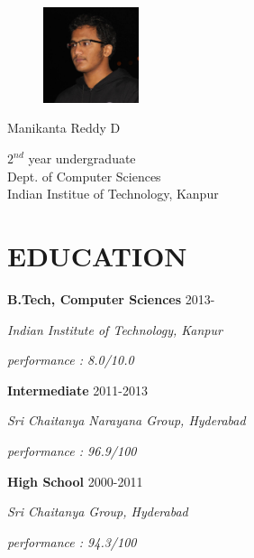 \message{ !name(Resume.tex)}\documentclass{article}
\newcommand{\sepspace}{\vspace*{1em}}
\newcommand{\MyName}[1]{
		\huge \usefont{OT1}{phv}{b}{n} \hfill #1 		
		\par \normalsize \normalfont}
\newcommand{\NewPart}[1]{\section*{\uppercase{#1}}}
\newcommand{\EducationEntry}[4]{
		\noindent \textbf{#1} \hfill 	{#2} \par				
		\noindent \textit{#3} \par	
		\noindent #4 	
		\normalsize \par}
\begin{document}

\begin{figure}
	\vspace*{-2em}
		\includegraphics[width=0.25\textwidth]{photo.jpg}
\end{figure}

\MyName{Manikanta Reddy D}
\begin{flushright}
$2^{nd}$ year undergraduate\\
Dept. of Computer Sciences\\
Indian Institue of Technology, Kanpur
\end{flushright}

\sepspace
\NewPart{Education}{}
\EducationEntry{B.Tech, Computer Sciences}{2013-}{Indian Institute of Technology, Kanpur}{\emph{performance : 8.0/10.0}}
\sepspace
\EducationEntry{Intermediate}{2011-2013}{Sri Chaitanya Narayana Group, Hyderabad}{\b{\emph{performance : 96.9/100}}}
\sepspace
\EducationEntry{High School}{2000-2011}{Sri Chaitanya Group, Hyderabad}{\b{\emph{performance : 94.3/100}}}
\sepspace
\end{document}
